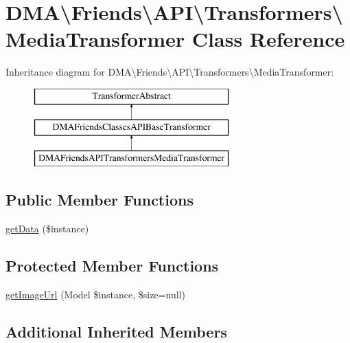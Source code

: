 \hypertarget{classDMA_1_1Friends_1_1API_1_1Transformers_1_1MediaTransformer}{}\section{D\+M\+A\textbackslash{}Friends\textbackslash{}A\+P\+I\textbackslash{}Transformers\textbackslash{}Media\+Transformer Class Reference}
\label{classDMA_1_1Friends_1_1API_1_1Transformers_1_1MediaTransformer}
Inheritance diagram for D\+M\+A\textbackslash{}Friends\textbackslash{}A\+P\+I\textbackslash{}Transformers\textbackslash{}Media\+Transformer\+:\begin{figure}[H]
\begin{center}
\leavevmode
\includegraphics[height=3.000000cm]{d8/d43/classDMA_1_1Friends_1_1API_1_1Transformers_1_1MediaTransformer}
\end{center}
\end{figure}
\subsection*{Public Member Functions}
\begin{DoxyCompactItemize}
\item 
\hyperlink{classDMA_1_1Friends_1_1API_1_1Transformers_1_1MediaTransformer_ae95306d52270bf068bfccb87a537fdf0}{get\+Data} (\$instance)
\end{DoxyCompactItemize}
\subsection*{Protected Member Functions}
\begin{DoxyCompactItemize}
\item 
\hyperlink{classDMA_1_1Friends_1_1API_1_1Transformers_1_1MediaTransformer_aac92b6cb041d5de2336218c380e7c787}{get\+Image\+Url} (Model \$instance, \$size=null)
\end{DoxyCompactItemize}
\subsection*{Additional Inherited Members}


